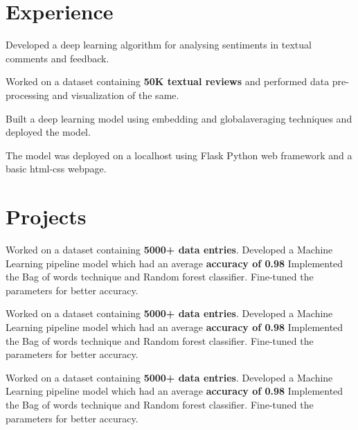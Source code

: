 \documentclass[]{deedy-resume-openfont}
\begin{document}
\begin{minipage}[t]{0.66\textwidth} 


\section{{Experience}}
\vspace{\topsep}
\begin{tightemize}
\large{\item Developed a deep learning algorithm for analysing sentiments in textual comments and feedback.
\item Worked on a dataset containing \textbf{50K textual reviews} and performed data pre-processing and visualization of the same.
\item Built a deep learning model using embedding and globalaveraging techniques and deployed the model.
\item The model was deployed on a localhost using Flask Python web framework and a basic html-css webpage. }
\end{tightemize}
\sectionsep

\section{Projects}
\large{Worked on a dataset containing \textbf{5000+ data entries}.
Developed a Machine Learning pipeline model which had an average \textbf{accuracy of 0.98}
Implemented the Bag of words technique and Random forest classifier. Fine-tuned the parameters for better accuracy.}
\sectionsep

\large{Worked on a dataset containing \textbf{5000+ data entries}.
Developed a Machine Learning pipeline model which had an average \textbf{accuracy of 0.98}
Implemented the Bag of words technique and Random forest classifier. Fine-tuned the parameters for better accuracy.}
\sectionsep

\large{Worked on a dataset containing \textbf{5000+ data entries}.
Developed a Machine Learning pipeline model which had an average \textbf{accuracy of 0.98}
Implemented the Bag of words technique and Random forest classifier. Fine-tuned the parameters for better accuracy.}
\sectionsep


\end{minipage}
\end{document}
